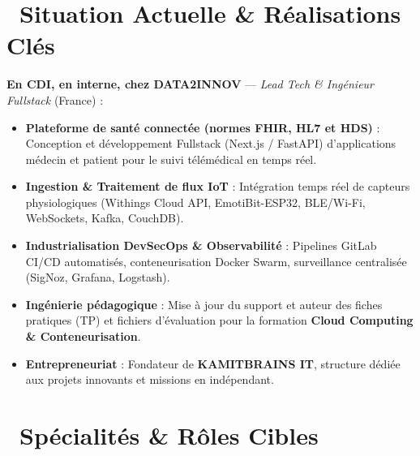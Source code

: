 \documentclass[10pt,a4paper]{article}
\begin{document}
\vspace{0.1em}

\section{\faBriefcase\ Situation Actuelle \& Réalisations Clés}

\textbf{En CDI, en interne, chez DATA2INNOV} --- \emph{Lead Tech \& Ingénieur Fullstack} (France) :
\begin{itemize}[leftmargin=1.4em, itemsep=0.2em, topsep=0.15em]
    \item \textbf{Plateforme de santé connectée (normes FHIR, HL7 et HDS)} : Conception et développement Fullstack (Next.js / FastAPI) d'applications médecin et patient pour le suivi télémédical en temps réel.
    \item \textbf{Ingestion \& Traitement de flux IoT} : Intégration temps réel de capteurs physiologiques (Withings Cloud API, EmotiBit-ESP32, BLE/Wi-Fi, WebSockets, Kafka, CouchDB).
    \item \textbf{Industrialisation DevSecOps \& Observabilité} : Pipelines GitLab CI/CD automatisés, conteneurisation Docker Swarm, surveillance centralisée (SigNoz, Grafana, Logstash).
    \item \textbf{Ingénierie pédagogique} : Mise à jour du support et auteur des fiches pratiques (TP) et fichiers d'évaluation pour la formation \textbf{Cloud Computing \& Conteneurisation}.
    \item \textbf{Entrepreneuriat} : Fondateur de \textbf{KAMITBRAINS IT}, structure dédiée aux projets innovants et missions en indépendant.
\end{itemize}

\vspace{0.1em}

\section{\faBullseye\ Spécialités \& Rôles Cibles}
\end{document}
